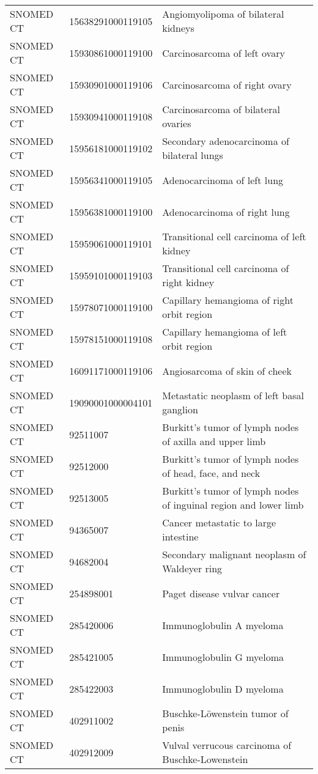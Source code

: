 \begin{longtable}{p{}p{}p{}}
  SNOMED CT & 15638291000119105 & Angiomyolipoma of bilateral kidneys \\ 
  SNOMED CT & 15930861000119100 & Carcinosarcoma of left ovary \\ 
  SNOMED CT & 15930901000119106 & Carcinosarcoma of right ovary \\ 
  SNOMED CT & 15930941000119108 & Carcinosarcoma of bilateral ovaries \\ 
  SNOMED CT & 15956181000119102 & Secondary adenocarcinoma of bilateral lungs \\ 
  SNOMED CT & 15956341000119105 & Adenocarcinoma of left lung \\ 
  SNOMED CT & 15956381000119100 & Adenocarcinoma of right lung \\ 
  SNOMED CT & 15959061000119101 & Transitional cell carcinoma of left kidney \\ 
  SNOMED CT & 15959101000119103 & Transitional cell carcinoma of right kidney \\ 
  SNOMED CT & 15978071000119100 & Capillary hemangioma of right orbit region \\ 
  SNOMED CT & 15978151000119108 & Capillary hemangioma of left orbit region \\ 
  SNOMED CT & 16091171000119106 & Angiosarcoma of skin of cheek \\ 
  SNOMED CT & 19090001000004101 & Metastatic neoplasm of left basal ganglion \\ 
  SNOMED CT & 92511007 & Burkitt's tumor of lymph nodes of axilla and upper limb \\ 
  SNOMED CT & 92512000 & Burkitt's tumor of lymph nodes of head, face, and neck \\ 
  SNOMED CT & 92513005 & Burkitt's tumor of lymph nodes of inguinal region and lower limb \\ 
  SNOMED CT & 94365007 & Cancer metastatic to large intestine \\ 
  SNOMED CT & 94682004 & Secondary malignant neoplasm of Waldeyer ring \\ 
  SNOMED CT & 254898001 & Paget disease vulvar cancer \\ 
  SNOMED CT & 285420006 & Immunoglobulin A myeloma \\ 
  SNOMED CT & 285421005 & Immunoglobulin G myeloma \\ 
  SNOMED CT & 285422003 & Immunoglobulin D myeloma \\ 
  SNOMED CT & 402911002 & Buschke-Löwenstein tumor of penis \\ 
  SNOMED CT & 402912009 & Vulval verrucous carcinoma of Buschke-Lowenstein \\ 

\end{longtable}
